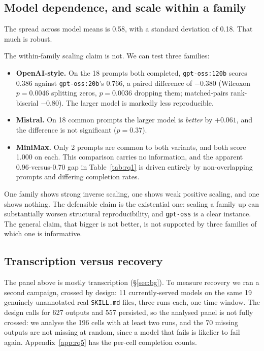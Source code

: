 \documentclass{article}
\begin{document}
\subsection{Model dependence, and scale within a family}

The spread across model means is 0.58, with a standard deviation of 0.18. That much is robust.

The within-family scaling claim is not. We can test three families:

\begin{itemize}
  \item \textbf{OpenAI-style.} On the 18 prompts both completed, \texttt{gpt-oss:120b} scores 0.386 against \texttt{gpt-oss:20b}'s 0.766, a paired difference of $-0.380$ (Wilcoxon $p=0.0046$ splitting zeros, $p=0.0036$ dropping them; matched-pairs rank-biserial $-0.80$). The larger model is markedly less reproducible.
  \item \textbf{Mistral.} On 18 common prompts the larger model is \emph{better} by $+0.061$, and the difference is not significant ($p=0.37$).
  \item \textbf{MiniMax.} Only 2 prompts are common to both variants, and both score 1.000 on each. This comparison carries no information, and the apparent 0.96-versus-0.70 gap in Table~\ref{tab:rq1} is driven entirely by non-overlapping prompts and differing completion rates.
\end{itemize}

One family shows strong inverse scaling, one shows weak positive scaling, and one shows nothing. The defensible claim is the existential one: scaling a family up can substantially worsen structural reproducibility, and \texttt{gpt-oss} is a clear instance. The general claim, that bigger is not better, is not supported by three families of which one is informative.

\subsection{Transcription versus recovery}

The panel above is mostly transcription (\S\ref{sec:bg}). To measure recovery we ran a second campaign, crossed by design: 11 currently-served models on the same 19 genuinely unannotated real \texttt{SKILL.md} files, three runs each, one time window. The design calls for 627 outputs and 557 persisted, so the analysed panel is not fully crossed: we analyse the 196 cells with at least two runs, and the 70 missing outputs are not missing at random, since a model that fails is likelier to fail again. Appendix~\ref{app:rq5} has the per-cell completion counts.
\end{document}

